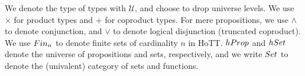 We denote the type of types with $\mathcal{U}$, and choose to drop universe levels.
We use $\times$ for product types and $+$ for coproduct types.
For mere propositions, we use $\land$ to denote conjunction,
and $\vee$ to denote logical disjunction (truncated coproduct).
We use $\Fin[n]$ to denote finite sets of cardinality $n$ in HoTT.
$\hProp$ and $\hSet$ denote the universe of propositions and sets, respectively,
and we write $\Set$ to denote the (univalent) category of sets and functions.
